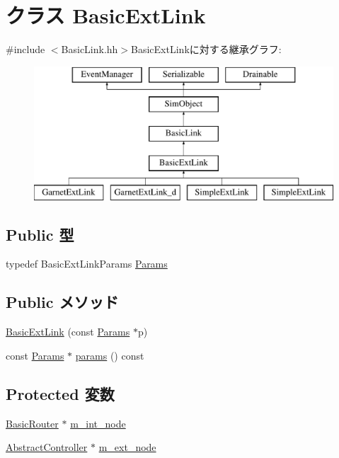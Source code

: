 \hypertarget{classBasicExtLink}{
\section{クラス BasicExtLink}
\label{classBasicExtLink}
}


{\ttfamily \#include $<$BasicLink.hh$>$}BasicExtLinkに対する継承グラフ:\begin{figure}[H]
\begin{center}
\leavevmode
\includegraphics[height=5cm]{classBasicExtLink}
\end{center}
\end{figure}
\subsection*{Public 型}
\begin{DoxyCompactItemize}
\item 
typedef BasicExtLinkParams \hyperlink{classBasicExtLink_a124f6e2dedf13bd42661a62b7e155cee}{Params}
\end{DoxyCompactItemize}
\subsection*{Public メソッド}
\begin{DoxyCompactItemize}
\item 
\hyperlink{classBasicExtLink_a57eaee7926e07a173bdf9c2ff6fdc1f3}{BasicExtLink} (const \hyperlink{classBasicExtLink_a124f6e2dedf13bd42661a62b7e155cee}{Params} $\ast$p)
\item 
const \hyperlink{classBasicExtLink_a124f6e2dedf13bd42661a62b7e155cee}{Params} $\ast$ \hyperlink{classBasicExtLink_acd3c3feb78ae7a8f88fe0f110a718dff}{params} () const 
\end{DoxyCompactItemize}
\subsection*{Protected 変数}
\begin{DoxyCompactItemize}
\item 
\hyperlink{classBasicRouter}{BasicRouter} $\ast$ \hyperlink{classBasicExtLink_aa88d834bd88ceb42e38634a4ff5b8df8}{m\_\-int\_\-node}
\item 
\hyperlink{classAbstractController}{AbstractController} $\ast$ \hyperlink{classBasicExtLink_a7c393355ad0c2633a9daf6d293426c97}{m\_\-ext\_\-node}
\end{DoxyCompactItemize}
